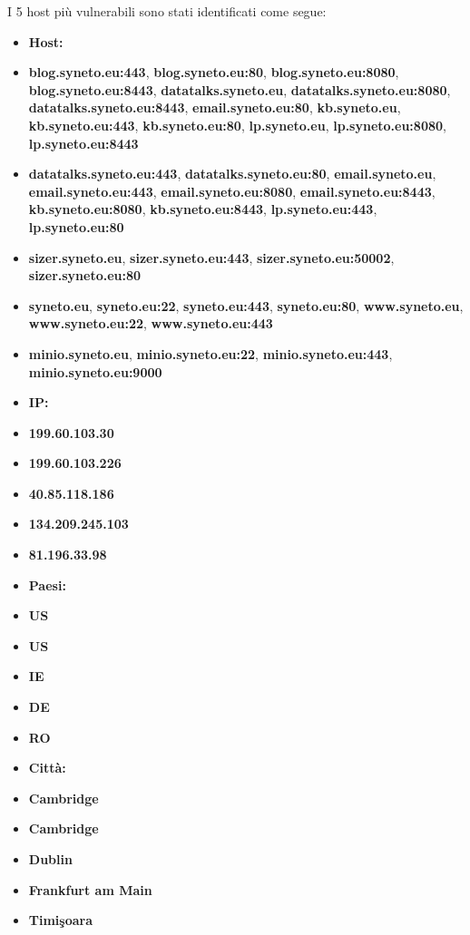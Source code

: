 I 5 host più vulnerabili sono stati identificati come segue:
\begin{itemize}
\item \textbf{Host:}
\item \textbf{blog.syneto.eu:443}, \textbf{blog.syneto.eu:80}, \textbf{blog.syneto.eu:8080}, \textbf{blog.syneto.eu:8443}, \textbf{datatalks.syneto.eu}, \textbf{datatalks.syneto.eu:8080}, \textbf{datatalks.syneto.eu:8443}, \textbf{email.syneto.eu:80}, \textbf{kb.syneto.eu}, \textbf{kb.syneto.eu:443}, \textbf{kb.syneto.eu:80}, \textbf{lp.syneto.eu}, \textbf{lp.syneto.eu:8080}, \textbf{lp.syneto.eu:8443}
\item \textbf{datatalks.syneto.eu:443}, \textbf{datatalks.syneto.eu:80}, \textbf{email.syneto.eu}, \textbf{email.syneto.eu:443}, \textbf{email.syneto.eu:8080}, \textbf{email.syneto.eu:8443}, \textbf{kb.syneto.eu:8080}, \textbf{kb.syneto.eu:8443}, \textbf{lp.syneto.eu:443}, \textbf{lp.syneto.eu:80}
\item \textbf{sizer.syneto.eu}, \textbf{sizer.syneto.eu:443}, \textbf{sizer.syneto.eu:50002}, \textbf{sizer.syneto.eu:80}
\item \textbf{syneto.eu}, \textbf{syneto.eu:22}, \textbf{syneto.eu:443}, \textbf{syneto.eu:80}, \textbf{www.syneto.eu}, \textbf{www.syneto.eu:22}, \textbf{www.syneto.eu:443}
\item \textbf{minio.syneto.eu}, \textbf{minio.syneto.eu:22}, \textbf{minio.syneto.eu:443}, \textbf{minio.syneto.eu:9000}
\item \textbf{IP:}
\item \textbf{199.60.103.30}
\item \textbf{199.60.103.226}
\item \textbf{40.85.118.186}
\item \textbf{134.209.245.103}
\item \textbf{81.196.33.98}
\item \textbf{Paesi:}
\item \textbf{US}
\item \textbf{US}
\item \textbf{IE}
\item \textbf{DE}
\item \textbf{RO}
\item \textbf{Città:}
\item \textbf{Cambridge}
\item \textbf{Cambridge}
\item \textbf{Dublin}
\item \textbf{Frankfurt am Main}
\item \textbf{Timişoara}
\end{itemize}
